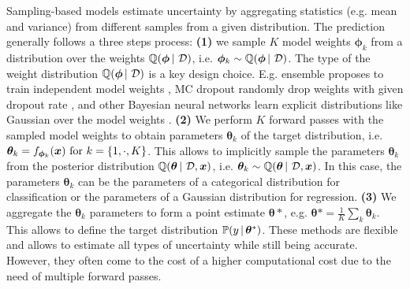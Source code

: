 Sampling-based models estimate uncertainty by aggregating statistics (e.g. mean and variance) from different samples from a given distribution. The prediction generally follows a three steps process:
\textbf{(1)} we sample $K$ model weights $\bm{\phi}_k$ from a distribution over the weights $\operatorname{\mathbb{Q}}(\bm{\phi} \,|\, \operatorname{\mathcal{D}})$, i.e. $\bm{\phi}_k \sim \operatorname{\mathbb{Q}}(\bm{\phi} \,|\, \operatorname{\mathcal{D}})$. The type of the weight distribution $\operatorname{\mathbb{Q}}(\bm{\phi} \,|\, \operatorname{\mathcal{D}})$ is a key design choice. E.g. ensemble proposes to train independent model weights \cite{ensembles}, MC dropout randomly drop weights with given dropout rate \cite{dropout}, and other Bayesian neural networks learn explicit distributions like Gaussian over the model weights \cite{bayesian-networks}. \textbf{(2)} We perform $K$ forward passes with the sampled model weights to obtain parameters $\bm{\theta}_k$ of the target distribution, i.e. $\bm{\theta}_k = f_{\bm{\phi}_k}(\bm{x}) \text{ for } k=\{1,\cdot,K\}$. This allows to implicitly sample the parameters $\bm{\theta}_k$ from the posterior distribution $\operatorname{\mathbb{Q}}(\bm{\theta} \,|\, \operatorname{\mathcal{D}}, \bm{x})$, i.e. $\bm{\theta}_k \sim \operatorname{\mathbb{Q}}(\bm{\theta} \,|\, \operatorname{\mathcal{D}}, \bm{x})$. In this case, the parameters $\bm{\theta}_k$ can be the parameters of a categorical distribution for classification or the parameters of a Gaussian distribution for regression. \textbf{(3)} We aggregate the $\bm{\theta}_k$ parameters to form a point estimate $\bm{\theta}*$, e.g. $\bm{\theta}*=\frac{1}{K}\sum_k \bm{\theta}_k$. This allows to define the target distribution $\mathbb{P}(y \,|\, \bm{\theta}^*)$. These methods are flexible and allows to estimate all types of uncertainty while still being accurate. However, they often come to the cost of a higher computational cost due to the need of multiple forward passes.

